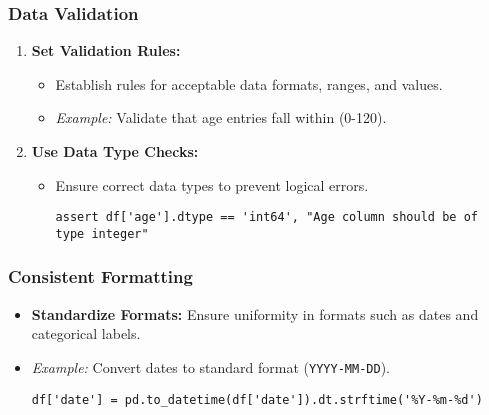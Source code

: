 \documentclass[aspectratio=169]{beamer}
\begin{document}
\begin{frame}[fragile]
    \frametitle{Data Validation}
    \begin{enumerate}
        \item \textbf{Set Validation Rules:}
        \begin{itemize}
            \item Establish rules for acceptable data formats, ranges, and values.
            \item \textit{Example:} Validate that age entries fall within (0-120).
        \end{itemize}

        \item \textbf{Use Data Type Checks:}
        \begin{itemize}
            \item Ensure correct data types to prevent logical errors.
            \begin{lstlisting}
assert df['age'].dtype == 'int64', "Age column should be of type integer"
            \end{lstlisting}
        \end{itemize}
    \end{enumerate}
\end{frame}

\begin{frame}[fragile]
    \frametitle{Consistent Formatting}
    \begin{itemize}
        \item \textbf{Standardize Formats:} Ensure uniformity in formats such as dates and categorical labels.
        \item \textit{Example:} Convert dates to standard format (\texttt{YYYY-MM-DD}).
        \begin{lstlisting}
df['date'] = pd.to_datetime(df['date']).dt.strftime('%Y-%m-%d')
        \end{lstlisting}
    \end{itemize}
\end{frame}
\end{document}

